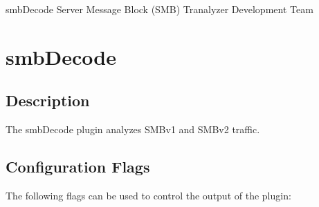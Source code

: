 \documentclass[documentation]{subfiles}
\begin{document}
\trantitle
    {smbDecode}
    {Server Message Block (SMB)}
    {Tranalyzer Development Team} %

\section{smbDecode}\label{s:smbDecode}

\subsection{Description}
The smbDecode plugin analyzes SMBv1 and SMBv2 traffic.

\subsection{Configuration Flags}
The following flags can be used to control the output of the plugin:
\end{document}
